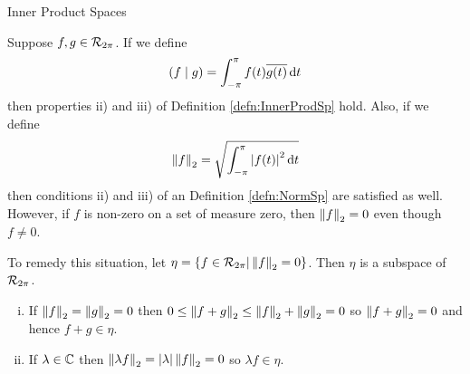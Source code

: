 \begin{section}{Inner Product Spaces}
\begin{soln}
\begin{enumerate}[i)]
		\end{enumerate}
\end{soln}


\begin{ex}
	Suppose $f,g \in \riemmint$. If we define
		\begin{displaymath}
			\innrprod{f}{g} = \myintb[\pi]{f(t)\conj{g(t)}}{t}
		\end{displaymath}
	then properties ii) and iii) of Definition \ref{defn:InnerProdSp}
	hold. Also, if we define
		\begin{displaymath}
			\norm{f} = \sqrt{\myintb[\pi]{\modulus{f(t)}^2}{t}}
		\end{displaymath}
	then conditions ii) and iii) of an Definition \ref{defn:NormSp}
	are satisfied as well. However, if $f$ is non-zero	on a set of
	measure zero, then $\norm{f} = 0$ even though $f \neq 0$. 
	
	To remedy this situation, let 
	$\eta = \{f \in \riemmint | \norm{f} = 0\}$. Then $\eta$ is
	a subspace of $\riemmint$.
		\begin{enumerate}[i)]
			\item
				If $\norm{f} = \norm{g} = 0$ then $0 \leq \norm{f+g} 
				\leq \norm{f} + \norm{g} = 0$ so $\norm{f+g}=0$
				and hence $f+g \in \eta$.
			\item
				If $\iscmplx[\lambda]$ then $\norm{\lambda f}
				= \modulus{\lambda}\norm{f} = 0$ so $\lambda f \in
				\eta$.
		\end{enumerate}
	

\end{ex}
\end{section}
